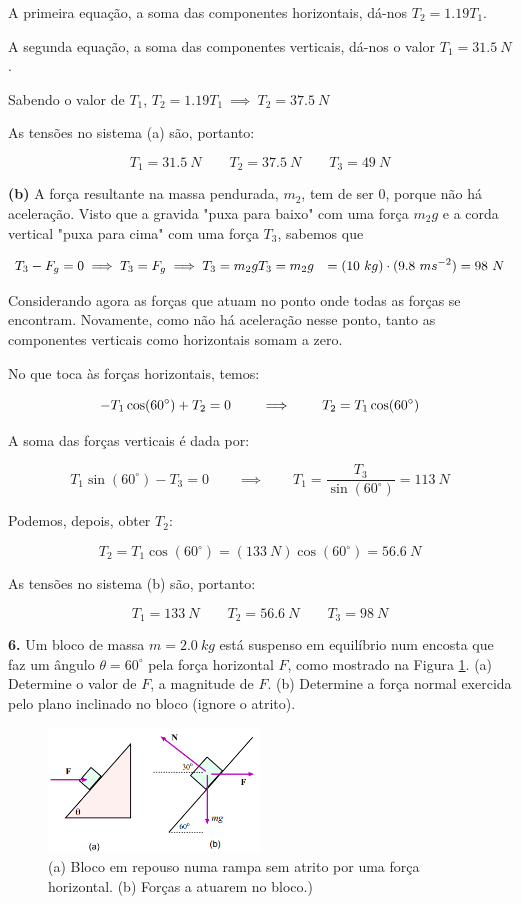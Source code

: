 A primeira equação, a soma das componentes horizontais, dá-nos $T_2=1.19T_1$.

A segunda equação,  a soma das componentes verticais, dá-nos o valor  $T_1=31.5\ N$.

Sabendo o valor de $T_1$, $T_2=1.19T_1\ \implies \ T_2=37.5\ N$

As tensões no sistema (a) são, portanto:

$$
T_1=31.5\ N \qquad T_2=37.5\ N \qquad T_3=49\ N
$$

\textbf{(b)} A força resultante na massa pendurada, $m_2$, tem de ser 0, porque não há aceleração. Visto que a gravida "puxa para baixo" com uma força $m_2g$ e a corda vertical "puxa para cima" com uma força $T_3$, sabemos que

$$
T_3-F_g=0 \implies T_3=F_g \implies T_3=m_2g \\
\begin{aligned}
    T_3&=m_2g
    &=(10\ kg)\cdot(9.8\ ms^{-2})=98\ N
\end{aligned}
$$

Considerando agora as forças que atuam no ponto onde todas as forças se encontram. Novamente, como não há aceleração nesse ponto, tanto as componentes verticais como horizontais somam a zero.

No que toca às forças horizontais, temos:

$$
-T_1\cos(60^{\circ})+T_2=0 \qquad \implies \qquad T_2=T_1\cos(60^{\circ}) \\
$$

A soma das forças verticais é dada por:

$$
T_1\sin(60^{\circ})-T_3=0 \qquad \implies \qquad T_1=\frac{T_3}{\sin(60^{\circ})}=113\ N
$$

Podemos, depois, obter $T_2$:

$$
T_2=T_1\cos(60^{\circ})=(133\ N)\cos(60^{\circ})=56.6\ N
$$

As tensões no sistema (b) são, portanto:

$$
T_1=133\ N \qquad T_2=56.6\ N \qquad T_3=98\ N
$$

\textbf{6.} Um bloco de massa $m=2.0\ kg$ está suspenso em equilíbrio num encosta que faz um ângulo $\theta=60^{\circ}$ pela força horizontal $F$, como mostrado na Figura \ref{fig:6plano}. (a) Determine o valor de $F$, a magnitude de $F$. (b) Determine a força normal exercida pelo plano inclinado no bloco (ignore o atrito).
\linebreak
\begin{figure}[h!]
    \centering
    \includegraphics[width=0.5\textwidth]{forças/fig/ex6.png}
    \caption{(a) Bloco em repouso numa rampa sem atrito por uma força horizontal. (b) Forças a atuarem no bloco.)}
    \label{fig:6plano}
\end{figure}

